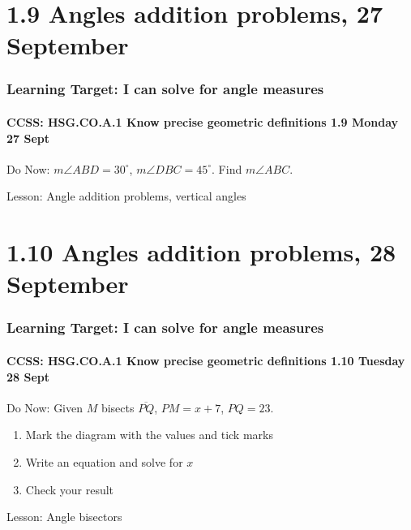 \documentclass{beamer}
\begin{document}
  \section{1.9 Angles addition problems, 27 September}
  \frame
  {
    \frametitle{Learning Target: I can solve for angle measures}
    \framesubtitle{CCSS: HSG.CO.A.1 Know precise geometric definitions  \hfill \alert{1.9 Monday 27 Sept}}
  
    \begin{block}{Do Now: $m\angle ABD=30^\circ$, $m\angle DBC=45^\circ$. Find $m\angle ABC$.}\vspace{0.5cm}
            \begin{center}
              \end{center}
    \end{block}
    Lesson: Angle addition problems, vertical angles
  }
  
  \section{1.10 Angles addition problems, 28 September}
  \frame
  {
    \frametitle{Learning Target: I can solve for angle measures}
    \framesubtitle{CCSS: HSG.CO.A.1 Know precise geometric definitions  \hfill \alert{1.10 Tuesday 28 Sept}}
  
    \begin{block}{Do Now: Given $M$ bisects $\overline{PQ}$, $PM=x+7$, $PQ=23$.}
      \begin{enumerate}
        \item Mark the diagram with the values and tick marks
        \item Write an equation and solve for $x$
        \item Check your result
      \end{enumerate} \vspace{0.5cm}
        \begin{center}
        \end{center}
    \end{block}
    Lesson: Angle bisectors
  }
  
\end{document}
